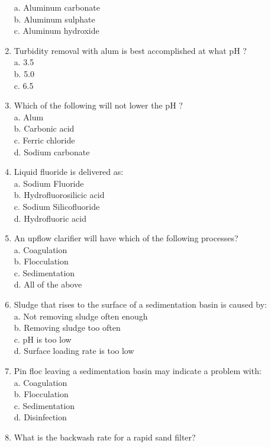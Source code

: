 \begin{enumerate}
a. Aluminum carbonate\\
b. Aluminum sulphate\\
c. Aluminum hydroxide\\
\item Turbidity removal with alum is best accomplished at what $\mathrm{pH}$ ?\\
a. 3.5\\
b. 5.0\\
c. 6.5\\
\item Which of the following will not lower the $\mathrm{pH}$ ?\\
a. Alum\\
b. Carbonic acid\\
c. Ferric chloride\\
d. Sodium carbonate\\
\item Liquid fluoride is delivered as:\\
a. Sodium Fluoride\\
b. Hydrofluorosilicic acid\\
c. Sodium Silicofluoride\\
d. Hydrofluoric acid\\
\item An upflow clarifier will have which of the following processes?\\
a. Coagulation\\
b. Flocculation\\
c. Sedimentation\\
d. All of the above\\
\item Sludge that rises to the surface of a sedimentation basin is caused by:\\
a. Not removing sludge often enough\\
b. Removing sludge too often\\
c. $\mathrm{pH}$ is too low\\
d. Surface loading rate is too low\\
\item Pin floc leaving a sedimentation basin may indicate a problem with:\\
a. Coagulation\\
b. Flocculation\\
c. Sedimentation\\
d. Disinfection\\
\item What is the backwash rate for a rapid sand filter?\\

\end{enumerate}
